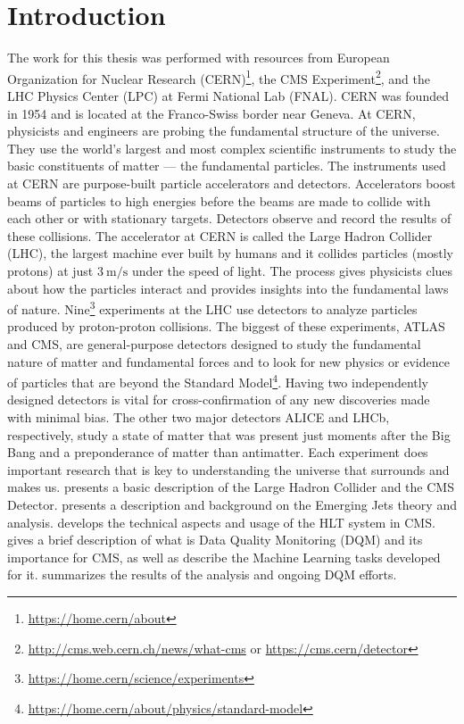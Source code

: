 \chapter{Introduction}

The work for this thesis was performed with resources from European Organization for Nuclear Research (CERN)\footnote{\url{https://home.cern/about}}, the CMS Experiment\footnote{\url{http://cms.web.cern.ch/news/what-cms} or \url{https://cms.cern/detector}}, and the LHC Physics Center (LPC) at Fermi National Lab (FNAL).
CERN was founded in 1954 and is located at the Franco-Swiss border near Geneva. At CERN, physicists and engineers are probing the fundamental structure of the universe. They use the world's largest and most complex scientific instruments to study the basic constituents of matter --- the fundamental particles.
The instruments used at CERN are purpose-built particle accelerators and detectors. Accelerators boost beams of particles to high energies before the beams are made to collide with each other or with stationary targets. Detectors observe and record the results of these collisions. The accelerator at CERN is called the Large Hadron Collider (LHC), the largest machine ever built by humans and it collides particles (mostly protons) at just
$\qty[per-mode = symbol]{3}{\meter\per\second}$ under the speed of light.
The process gives physicists clues about how the particles interact and provides insights into the fundamental laws of nature. Nine\footnote{\url{https://home.cern/science/experiments}} experiments at the LHC use detectors to analyze particles produced by proton-proton collisions.
The biggest of these experiments, ATLAS and CMS, are general-purpose detectors designed to study the
fundamental nature of matter and fundamental forces and to look for new physics or evidence of particles that are beyond the Standard Model\footnote{\url{https://home.cern/about/physics/standard-model}}. Having two independently designed detectors is vital for cross-confirmation of any new discoveries made with minimal bias. The other two major detectors ALICE and LHCb, respectively, study a state of matter that was present just moments after the Big Bang and a preponderance of matter than antimatter.  Each experiment does important research that is key to understanding the universe that surrounds and makes us.
 presents a basic description of the Large Hadron Collider and the CMS Detector.
 presents a description and background on the Emerging Jets theory and analysis.
 develops the technical aspects and usage of the HLT system in CMS.
 gives a brief description of what is Data Quality Monitoring (DQM) and its importance for CMS, as well as describe the Machine Learning tasks developed for it.
 summarizes the results of the analysis and ongoing DQM efforts.
